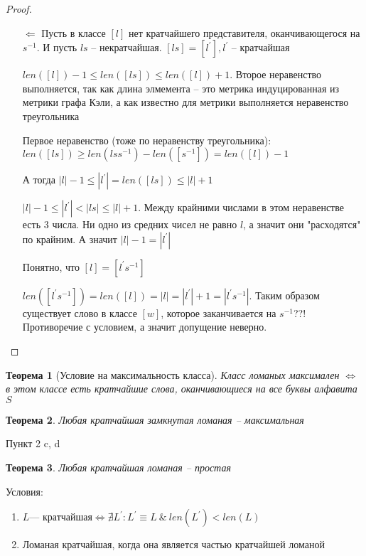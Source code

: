 \documentclass[serif, ucs]{beamer}
\newtheorem{Th}{Теорема}[section]
\newcommand{\p}[1]{#1^{\prime}}
\begin{document}
\begin{frame}
\begin{footnotesize}
\begin{proof}
	\begin{itemize}
		\item[$\Leftarrow$] Пусть в классе $[l]$ нет кратчайшего представителя, оканчивающегося на $s^{-1}$. И пусть $ls$ -- некратчайшая. $[ls] = [\p l], \p l$ -- кратчайшая
		
		$len([l]) - 1 \leqslant len([ls])\leqslant len([l]) + 1$. Второе неравенство выполняется, так как длина элмемента -- это метрика индуцированная из метрики графа Кэли, а как известно для метрики выполняется неравенство треугольника
		
		Первое неравенство (тоже по неравенству треугольника): $len([ls])\geqslant len(lss^{-1}) - len([s^{-1}]) = len([l]) - 1$
		
		А тогда $|l|-1 \leqslant |\p l | = len([ls])\leqslant |l| + 1$
		
		$|l| - 1\leqslant |\p l |<|ls|\leqslant |l|+1$. Между крайними числами в этом неравенстве есть 3 числа. Ни одно из средних чисел не равно $l$, а значит они "расходятся" по крайним. А значит $|l|-1 = |\p l|$

		Понятно, что $[l] = [\p l s^{-1}]$		
		
		$len([\p ls^{-1}]) = len([l]) = |l| = |\p l| + 1 = |\p l s^{-1}|$. Таким образом существует слово в классе $[w]$, которое заканчивается на $s^{-1}$??! Противоречие с условием, а значит допущение неверно.
	\end{itemize}
\end{proof}
\end{footnotesize}
\end{frame}

\begin{frame}
	\begin{Th}[Условие на максимальность класса]
		Класс ломаных максимален $\Longleftrightarrow$ в этом классе есть кратчайшие слова, оканчивающиеся на все буквы алфавита $S$
	\end{Th}
	
	\begin{Th}
		Любая кратчайшая замкнутая ломаная -- максимальная
	\end{Th}
\end{frame}

\begin{frame}{Пункт 2 c, d}
	\begin{Th}
		Любая кратчайшая ломаная -- простая
	\end{Th}
	
	Условия:
	\begin{enumerate}
		\item $L \text{--- кратчайшая}\Longleftrightarrow\nexists \p L: \p L\equiv L ~\&~ len(\p L)<len(L)$
		\item Ломаная кратчайшая, когда она является частью кратчайшей ломаной
	\end{enumerate}
\end{frame}
\end{document}
